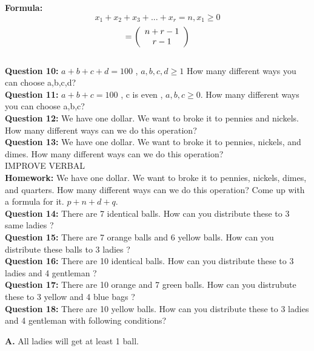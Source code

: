 \documentclass[11pt]{article}
\begin{document}
\textbf{Formula: } $$x_1 + x_2 + x_3 + ... + x_r = n , x_1 \geq 0$$ $$= \left( {\begin{array}{*{20}c} n+r-1 \\ r-1 \\ \end{array}} \right)$$
\\

\textbf{Question 10: }  $a+b+c+d = 100$ , $a,b,c,d \geq 1$ How many different ways you can choose a,b,c,d?
\\ %

\textbf{Question 11: }  $a+b+c = 100$ , c is even , $a,b,c \geq 0$. How many different ways you can choose a,b,c?
\\ %

\textbf{Question 12: }  We have one dollar. We want to broke it to pennies and nickels. How many different ways can we do this operation?
\\ %

\textbf{Question 13: }  We have one dollar. We want to broke it to pennies, nickels, and dimes. How many different ways can we do this operation?
\\ %

IMPROVE VERBAL
\\

\textbf{Homework: } We have one dollar. We want to broke it to pennies, nickels, dimes, and quarters. How many different ways can we do this operation? Come up with a formula for it. $p+n+d+q$.
\\ %

\textbf{Question 14: }  There are 7 identical balls. How can you distribute these to 3 same ladies ?
\\ %

\textbf{Question 15: }  There are 7 orange balls and 6 yellow balls. How can you distribute these balls to 3 ladies ?
\\ %

\textbf{Question 16: }  There are 10 identical balls. How can you distribute these to 3 ladies and 4 gentleman ?
\\ %

\textbf{Question 17: }  There are 10 orange and 7 green balls. How can you distrubute these to 3 yellow and 4 blue bags ?
\\%

\textbf{Question 18: }  There are 10 yellow balls. How can you distribute these to 3 ladies and 4 gentleman with following conditions?
\par %
\textbf{A.} All ladies will get at least 1 ball.
\end{document}
